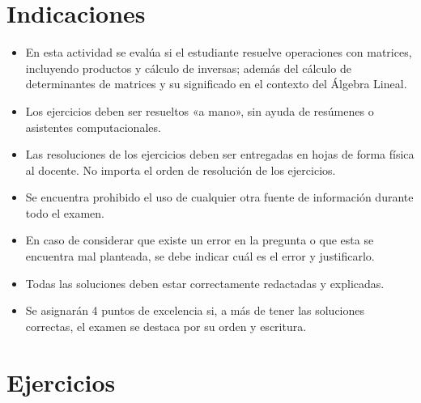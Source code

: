 \documentclass[11pt,respuestas,a4]{aleph-examen}
\begin{document}
\encabezado

\section*{Indicaciones}
\begin{itemize}[leftmargin=*]
\item 
    En esta actividad se evalúa si el estudiante resuelve operaciones con matrices, incluyendo productos y cálculo de inversas; además del cálculo de determinantes de matrices y su significado en el contexto del Álgebra Lineal.
\item 
    Los ejercicios deben ser resueltos «a mano», sin ayuda de resúmenes o asistentes computacionales.
\item
    Las resoluciones de los ejercicios deben ser entregadas en hojas de forma física al docente. No importa el orden de resolución de los ejercicios.
\item
    Se encuentra prohibido el uso de cualquier otra fuente de información durante todo el examen.
\item
    En caso de considerar que existe un error en la pregunta o que esta se encuentra mal planteada, se debe indicar cuál es el error y justificarlo.
\item
    Todas las soluciones deben estar correctamente redactadas y explicadas.
\item 
    Se asignarán 4 puntos de excelencia si, a más de tener las soluciones correctas, el examen se destaca por su orden y escritura.
\end{itemize}

\section*{Ejercicios}
\end{document}
